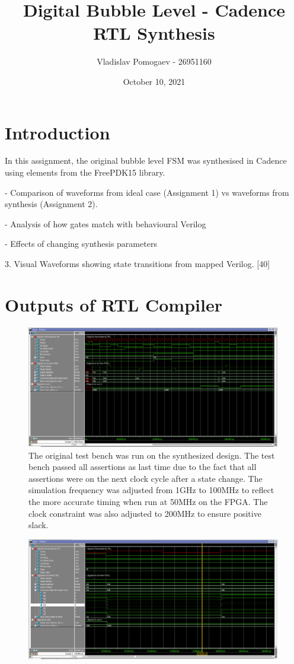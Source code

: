 \documentclass[11pt]{article}
\title{Digital Bubble Level - Cadence RTL Synthesis}
\author{Vladislav Pomogaev - 26951160}
\date{October 10, 2021}
\begin{document}
\maketitle

\section{Introduction}
In this assignment, the original bubble level FSM was synthesised in Cadence using elements from the FreePDK15 library.

- Comparison of waveforms from ideal case (Assignment 1) vs waveforms from synthesis (Assignment 2).

- Analysis of how gates match with behavioural Verilog

- Effects of changing synthesis parameters

3. Visual Waveforms showing state transitions from mapped Verilog. [40]

\section{Outputs of RTL Compiler}

\begin{figure}[H]
    \centering
\includegraphics[width=0.99\textwidth]{delayed_wave.png}
    \caption{The original test bench was run on the synthesized design. The test bench passed all assertions as last time due to the fact that all assertions were on the next clock cycle after a state change. The simulation frequency was adjusted from 1GHz to 100MHz to reflect the more accurate timing when run at 50MHz on the FPGA. The clock constraint was also adjusted to 200MHz to ensure positive slack. }
\end{figure}
\begin{figure}[H]
    \centering
\includegraphics[width=0.99\textwidth]{closeup_delayed_wave.png}
    \caption{}
\end{figure}
\end{document}
